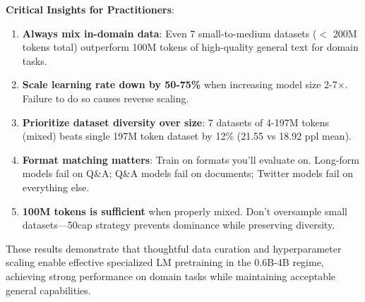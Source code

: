 \textbf{Critical Insights for Practitioners}:

\begin{enumerate}
\item \textbf{Always mix in-domain data}: Even 7 small-to-medium datasets ($<$ 200M tokens total) outperform 100M tokens of high-quality general text for domain tasks.
\item \textbf{Scale learning rate down by 50-75\%} when increasing model size 2-7$\times$. Failure to do so causes reverse scaling.
\item \textbf{Prioritize dataset diversity over size}: 7 datasets of 4-197M tokens (mixed) beats single 197M token dataset by 12\% (21.55 vs 18.92 ppl mean).
\item \textbf{Format matching matters}: Train on formats you'll evaluate on. Long-form models fail on Q\&A; Q\&A models fail on documents; Twitter models fail on everything else.
\item \textbf{100M tokens is sufficient} when properly mixed. Don't oversample small datasets—50cap strategy prevents dominance while preserving diversity.
\end{enumerate}

These results demonstrate that thoughtful data curation and hyperparameter scaling enable effective specialized LM pretraining in the 0.6B-4B regime, achieving strong performance on domain tasks while maintaining acceptable general capabilities.